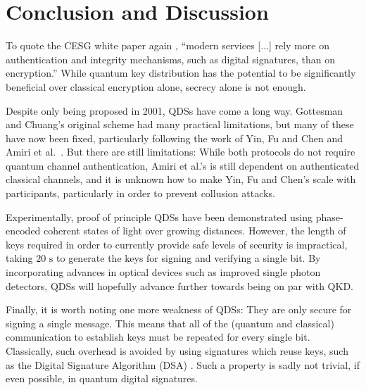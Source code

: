 \documentclass[%
 reprint,
 amsmath,amssymb,
 aps,
 pra,
]{revtex4-1}
\begin{document}
\section{Conclusion and Discussion}
\label{sec:conclusion}

To quote the CESG white paper again \cite{CESG16}, ``modern services [...] rely more on authentication and integrity mechanisms, such as digital signatures, than on encryption.'' While quantum key distribution has the potential to be significantly beneficial over classical encryption alone, secrecy alone is not enough.

Despite only being proposed in 2001, QDSs have come a long way. Gottesman and Chuang's original scheme \cite{quant-ph/0105032} had many practical limitations, but many of these have now been fixed, particularly following the work of Yin, Fu and Chen \cite{PhysRevA.93.032316} and Amiri et al.\ \cite{PhysRevA.93.032325}. But there are still limitations: While both protocols do not require quantum channel authentication, Amiri et al.'s is still dependent on authenticated classical channels, and it is unknown how to make Yin, Fu and Chen's scale with participants, particularly in order to prevent collusion attacks.

Experimentally, proof of principle QDSs have been demonstrated using phase-encoded coherent states of light over growing distances. However, the length of keys required in order to currently provide safe levels of security is impractical, taking $20\text{ s}$ to generate the keys for signing and verifying a single bit. By incorporating advances in optical devices such as improved single photon detectors, QDSs will hopefully advance further towards being on par with QKD.

Finally, it is worth noting one more weakness of QDSs: They are only secure for signing a single message. This means that all of the (quantum and classical) communication to establish keys must be repeated for every single bit. Classically, such overhead is avoided by using signatures which reuse keys, such as the Digital Signature Algorithm (DSA) \cite{kravitz1993digital}. Such a property is sadly not trivial, if even possible, in quantum digital signatures.


\appendix
\end{document}
